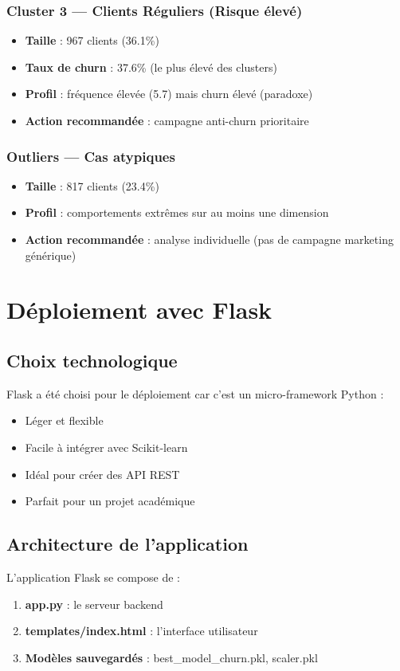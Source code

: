 \documentclass[11pt,a4paper]{article}
\begin{document}
\subsubsection{Cluster 3 — Clients Réguliers (Risque élevé)}
\begin{itemize}
    \item \textbf{Taille} : 967 clients (36.1\%)
    \item \textbf{Taux de churn} : 37.6\% (le plus élevé des clusters)
    \item \textbf{Profil} : fréquence élevée (5.7) mais churn élevé (paradoxe)
    \item \textbf{Action recommandée} : campagne anti-churn prioritaire
\end{itemize}

\subsubsection{Outliers — Cas atypiques}
\begin{itemize}
    \item \textbf{Taille} : 817 clients (23.4\%)
    \item \textbf{Profil} : comportements extrêmes sur au moins une dimension
    \item \textbf{Action recommandée} : analyse individuelle (pas de campagne marketing générique)
\end{itemize}

\newpage
\section{Déploiement avec Flask}

\subsection{Choix technologique}
Flask a été choisi pour le déploiement car c'est un micro-framework Python :
\begin{itemize}
    \item Léger et flexible
    \item Facile à intégrer avec Scikit-learn
    \item Idéal pour créer des API REST
    \item Parfait pour un projet académique
\end{itemize}

\subsection{Architecture de l'application}
L'application Flask se compose de :
\begin{enumerate}
    \item \textbf{app.py} : le serveur backend
    \item \textbf{templates/index.html} : l'interface utilisateur
    \item \textbf{Modèles sauvegardés} : best\_model\_churn.pkl, scaler.pkl
\end{enumerate}
\end{document}
